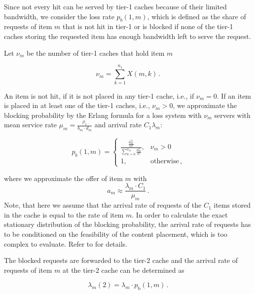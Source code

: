 Since not every hit can be served by tier-1 caches because of their limited bandwidth, we consider the loss rate $p_{b}(1,m)$, which is defined as the share of requests of item $m$ that is not hit in tier-1 or is blocked if none of the tier-1 caches storing the requested item has enough bandwidth left to serve the request.

Let $\nu_m$ be the number of tier-1 caches that hold item $m$

\begin{equation}
\nu_m=\sum_{k=1}^{n_1} X(m,k) \, .
\end{equation}

An item is not hit, if it is not placed in any tier-1 cache, i.e., if $\nu_m=0$.
If an item is placed in at least one of the tier-1 caches, i.e., $\nu_m>0$, we approximate the blocking probability by the Erlang formula for a loss system with $\nu_m$ servers with mean service rate $\mu_{m} = \frac{\rho_1}{b_m\cdot d_m}$ and arrival rate $C_1\lambda_m$:


\begin{equation}
p_{b}(1,m) =
	\begin{cases}
		\frac{\frac{a_m^{\nu_m}}{m!}}{\sum_{k=0}^{\nu_m}\frac{a_m^k}{k!}}, & \nu_m>0 \\
    1, & \text{otherwise} \, ,
	\end{cases}
\end{equation}

where we approximate the offer of item $m$ with
\begin{equation}
a_m \approx \frac{\lambda_m\cdot C_1}{\mu_m} \, .
\end{equation}
Note, that here we assume that the arrival rate of requests of the $C_1$ items stored in the cache is equal to the rate of item $m$.
In order to calculate the exact stationary distribution of the blocking probability, the arrival rate of requests has to be conditioned on the feasibility of the content placement, which is too complex to evaluate.
Refer to \cite{tan2013optimal} for details.

The blocked requests are forwarded to the tier-2 cache and the arrival rate of requests of item $m$ at the tier-2 cache can be determined as

\begin{equation}
	\lambda_m(2) = \lambda_m\cdot p_\text{b}(1,m) \, .
\end{equation}

